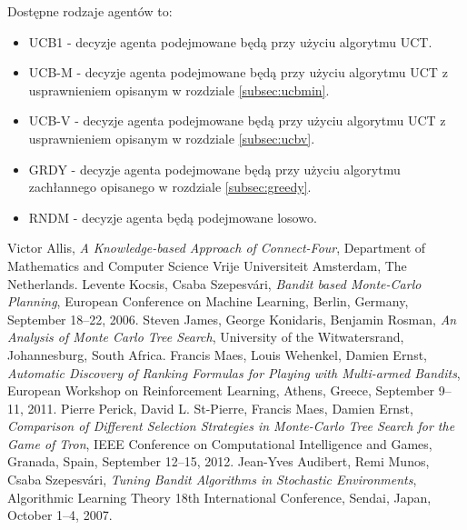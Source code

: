 \documentclass[a4paper,12pt]{article}
\begin{document}
Dostępne rodzaje agentów to:

\begin{itemize}
	\item UCB1 - decyzje agenta podejmowane będą przy użyciu algorytmu UCT.
	\item UCB-M - decyzje agenta podejmowane będą przy użyciu algorytmu UCT z usprawnieniem opisanym w rozdziale \ref{subsec:ucbmin}.
	\item UCB-V - decyzje agenta podejmowane będą przy użyciu algorytmu UCT z usprawnieniem opisanym w rozdziale \ref{subsec:ucbv}.
	\item GRDY - decyzje agenta podejmowane będą przy użyciu algorytmu zachłannego opisanego w rozdziale \ref{subsec:greedy}.
	\item RNDM - decyzje agenta będą podejmowane losowo.
\end{itemize}

\begin{thebibliography}{20}
	 Victor Allis, \emph{A Knowledge-based Approach of Connect-Four}, Department of Mathematics and Computer Science Vrije Universiteit Amsterdam, The Netherlands. %
	 Levente Kocsis, Csaba Szepesvári, \emph{Bandit based Monte-Carlo Planning}, European Conference on Machine Learning, Berlin, Germany, September 18--22, 2006.
	 Steven James, George Konidaris, Benjamin Rosman, \emph{An Analysis of Monte Carlo Tree Search}, University of the Witwatersrand, Johannesburg, South Africa.
	 Francis Maes, Louis Wehenkel, Damien Ernst, \emph{Automatic Discovery of Ranking Formulas for Playing with Multi-armed Bandits}, European Workshop on Reinforcement Learning, Athens, Greece, September 9--11, 2011.
	 Pierre Perick, David L. St-Pierre, Francis Maes, Damien Ernst, \emph{Comparison of Different Selection Strategies in Monte-Carlo Tree Search for the Game of Tron},  IEEE Conference on Computational Intelligence and Games, Granada, Spain, September 12--15, 2012. %
	 Jean-Yves Audibert, Remi Munos, Csaba Szepesvári, \emph{Tuning Bandit Algorithms in Stochastic Environments}, Algorithmic Learning Theory 18th International Conference, Sendai, Japan, October 1--4, 2007. %
\end{thebibliography}
\end{document}
